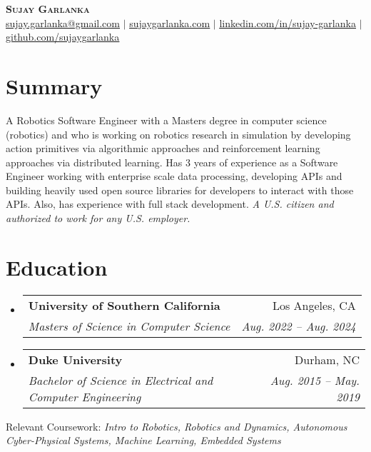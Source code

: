 \documentclass[letterpaper,10pt]{article}
\makeatletter
\newcommand{\resumeSubheading}[4]{
  \vspace{-2pt}\item
    \begin{tabular*}{0.97\textwidth}[t]{l@{\extracolsep{\fill}}r}
      \textbf{#1} & #2 \\
      \textit{\small#3} & \textit{\small #4} \\
    \end{tabular*}\vspace{-7pt}
}
\newcommand{\resumeSubHeadingListStart}{\begin{itemize}[leftmargin=0.15in, label={}]}
\newcommand{\resumeSubHeadingListEnd}{\end{itemize}}
\makeatother
\begin{document}

\begin{center}
    \textbf{\Huge \scshape Sujay Garlanka} \\ \vspace{1pt}
    \href{mailto:sujay.garlanka@gmail.com}
    {\small \underline{sujay.garlanka@gmail.com}} $|$ 
    \href{https://www.sujaygarlanka.com}
    {\small \underline{sujaygarlanka.com}} $|$
    \href{https://www.linkedin.com/in/sujay-garlanka/}
    {\small \underline{linkedin.com/in/sujay-garlanka}} $|$
    \href{https://github.com/sujaygarlanka}
    {\small \underline{github.com/sujaygarlanka}}
\end{center}

\section{Summary}
    \small A Robotics Software Engineer with a Masters degree in computer science (robotics) and who is working on robotics research in simulation by developing action primitives via algorithmic approaches and reinforcement learning approaches via distributed learning. Has 3 years of experience as a Software Engineer working with enterprise scale data processing, developing APIs and building heavily used open source libraries for developers to interact with those APIs. Also, has experience with full stack development. \textit{A U.S. citizen and authorized to work for any U.S. employer.}

\section{Education}
  \resumeSubHeadingListStart
    \resumeSubheading
      {University of Southern California}{Los Angeles, CA}
      {Masters of Science in Computer Science}{Aug. 2022 -- Aug. 2024}
    \resumeSubheading
      {Duke University}{Durham, NC}
      {Bachelor of Science in Electrical and Computer Engineering}{Aug. 2015 -- May. 2019}
  \resumeSubHeadingListEnd
  \vspace{3pt}
  Relevant Coursework: \emph{Intro to Robotics, Robotics and Dynamics, Autonomous Cyber-Physical Systems, Machine Learning, Embedded Systems}
\end{document}
